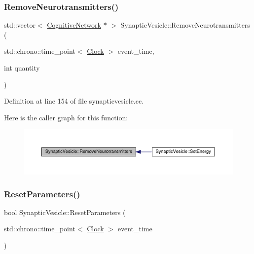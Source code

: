 \subsubsection{\texorpdfstring{Remove\+Neurotransmitters()}{RemoveNeurotransmitters()}}
{\footnotesize\ttfamily std\+::vector$<$ \hyperlink{class_cognitive_network}{Cognitive\+Network} $\ast$ $>$ Synaptic\+Vesicle\+::\+Remove\+Neurotransmitters (\begin{DoxyParamCaption}\item[{std\+::chrono\+::time\+\_\+point$<$ \hyperlink{universe_8h_a0ef8d951d1ca5ab3cfaf7ab4c7a6fd80}{Clock} $>$}]{event\+\_\+time,  }\item[{int}]{quantity }\end{DoxyParamCaption})}



Definition at line 154 of file synapticvesicle.\+cc.

Here is the caller graph for this function\+:
\nopagebreak
\begin{figure}[H]
\begin{center}
\leavevmode
\includegraphics[width=350pt]{class_synaptic_vesicle_aab1e61b4910399d56071ca59f2758e72_icgraph}
\end{center}
\end{figure}
\mbox{\label{class_synaptic_vesicle_add2f2815448729977fbcdbd5a59ec7b4}} 
\subsubsection{\texorpdfstring{Reset\+Parameters()}{ResetParameters()}}
{\footnotesize\ttfamily bool Synaptic\+Vesicle\+::\+Reset\+Parameters (\begin{DoxyParamCaption}\item[{std\+::chrono\+::time\+\_\+point$<$ \hyperlink{universe_8h_a0ef8d951d1ca5ab3cfaf7ab4c7a6fd80}{Clock} $>$}]{event\+\_\+time }\end{DoxyParamCaption})}



